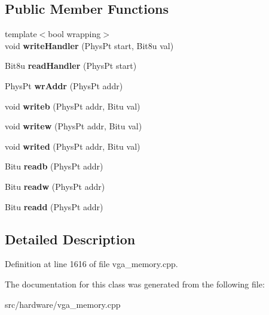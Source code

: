 \subsection*{Public Member Functions}
\begin{DoxyCompactItemize}
\item 
\hypertarget{classVGA__AMS__Handler_aeb0a1c400b9162e4e5e48bf0905d4865}{{\footnotesize template$<$bool wrapping$>$ }\\void {\bfseries write\-Handler} (Phys\-Pt start, Bit8u val)}\label{classVGA__AMS__Handler_aeb0a1c400b9162e4e5e48bf0905d4865}

\item 
\hypertarget{classVGA__AMS__Handler_a5661278164e2d7259ee9c8fe4c35d6df}{Bit8u {\bfseries read\-Handler} (Phys\-Pt start)}\label{classVGA__AMS__Handler_a5661278164e2d7259ee9c8fe4c35d6df}

\item 
\hypertarget{classVGA__AMS__Handler_a63b72ffd104220eb928c683bae72def3}{Phys\-Pt {\bfseries wr\-Addr} (Phys\-Pt addr)}\label{classVGA__AMS__Handler_a63b72ffd104220eb928c683bae72def3}

\item 
\hypertarget{classVGA__AMS__Handler_a59765d00055305e3d5d9cae3eda1a135}{void {\bfseries writeb} (Phys\-Pt addr, Bitu val)}\label{classVGA__AMS__Handler_a59765d00055305e3d5d9cae3eda1a135}

\item 
\hypertarget{classVGA__AMS__Handler_a2ca35cd2132c57ab9a6cd145ca686efd}{void {\bfseries writew} (Phys\-Pt addr, Bitu val)}\label{classVGA__AMS__Handler_a2ca35cd2132c57ab9a6cd145ca686efd}

\item 
\hypertarget{classVGA__AMS__Handler_a3a628a09de5d72345c7b602f162de07b}{void {\bfseries writed} (Phys\-Pt addr, Bitu val)}\label{classVGA__AMS__Handler_a3a628a09de5d72345c7b602f162de07b}

\item 
\hypertarget{classVGA__AMS__Handler_aa0a91b3133a6f53ab71af097705e5576}{Bitu {\bfseries readb} (Phys\-Pt addr)}\label{classVGA__AMS__Handler_aa0a91b3133a6f53ab71af097705e5576}

\item 
\hypertarget{classVGA__AMS__Handler_a91ae2471698b76066cff1f58dac6708c}{Bitu {\bfseries readw} (Phys\-Pt addr)}\label{classVGA__AMS__Handler_a91ae2471698b76066cff1f58dac6708c}

\item 
\hypertarget{classVGA__AMS__Handler_a98c3e7090b6a26e69c4afc84dc092415}{Bitu {\bfseries readd} (Phys\-Pt addr)}\label{classVGA__AMS__Handler_a98c3e7090b6a26e69c4afc84dc092415}

\end{DoxyCompactItemize}


\subsection{Detailed Description}


Definition at line 1616 of file vga\-\_\-memory.\-cpp.



The documentation for this class was generated from the following file\-:\begin{DoxyCompactItemize}
\item 
src/hardware/vga\-\_\-memory.\-cpp\end{DoxyCompactItemize}
